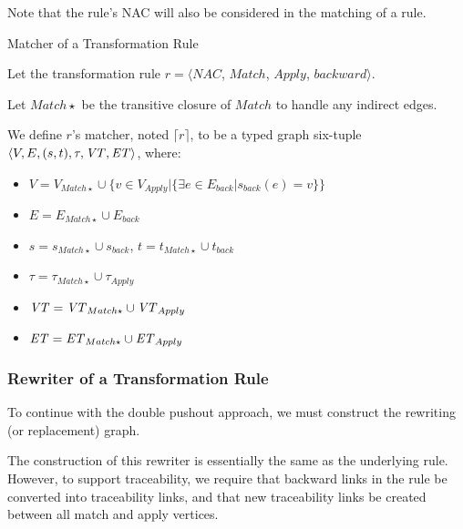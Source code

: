 Note that the rule's NAC will also be considered in the matching of a rule.

\begin{definition}{Matcher of a Transformation Rule\\}
\label{def:matcher_transformation_rule}

Let the transformation rule $r = \big\langle \mathit{NAC}$, $\mathit{Match}$, $\mathit{Apply}$, $\mathit{backward}\big\rangle$.

Let $\mathit{Match}\star$ be the transitive closure of $\mathit{Match}$ to handle any indirect edges.


We define $r$'s matcher, noted $\lceil r \rceil$, to be a typed graph six-tuple $\langle V,E,(s,t),\tau, \mathit{VT}, \mathit{ET}\rangle$, where:
\begin{itemize}
\item $V = V_{Match\star} \cup \big\{v \in V_{Apply} | \{\exists e \in E_{back} | s_{back}(e) = v\}\big\}$
\item $E = E_{Match\star} \cup E_{back}$
\item $s = s_{Match\star} \cup s_{back}$, $t = t_{Match\star} \cup t_{back}$
\item $\tau = \tau_{Match\star} \cup \tau_{Apply}$
\item $\mathit{VT} = \mathit{VT}_{Match\star} \cup \mathit{VT}_{Apply}$
\item $\mathit{ET} = \mathit{ET}_{Match\star} \cup \mathit{ET}_{Apply}$
\end{itemize}

\end{definition}

\subsubsection*{Rewriter of a Transformation Rule}

To continue with the double pushout approach, we must construct the rewriting (or replacement) graph.

The construction of this rewriter is essentially the same as the underlying rule. However, to support traceability, we require that backward links in the rule be converted into traceability links, and that new traceability links be created between all match and apply vertices. 

